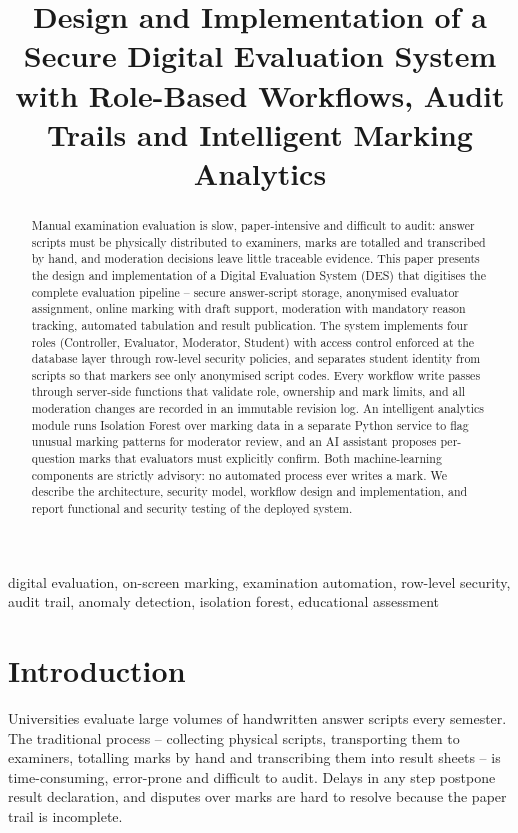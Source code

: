\documentclass[conference]{IEEEtran}
\begin{document}
\title{Design and Implementation of a Secure Digital Evaluation System with Role-Based Workflows, Audit Trails and Intelligent Marking Analytics}
\author{
}
\maketitle

\begin{abstract}
Manual examination evaluation is slow, paper-intensive and difficult to audit: answer scripts must be physically distributed to examiners, marks are totalled and transcribed by hand, and moderation decisions leave little traceable evidence. This paper presents the design and implementation of a Digital Evaluation System (DES) that digitises the complete evaluation pipeline -- secure answer-script storage, anonymised evaluator assignment, online marking with draft support, moderation with mandatory reason tracking, automated tabulation and result publication. The system implements four roles (Controller, Evaluator, Moderator, Student) with access control enforced at the database layer through row-level security policies, and separates student identity from scripts so that markers see only anonymised script codes. Every workflow write passes through server-side functions that validate role, ownership and mark limits, and all moderation changes are recorded in an immutable revision log. An intelligent analytics module runs Isolation Forest over marking data in a separate Python service to flag unusual marking patterns for moderator review, and an AI assistant proposes per-question marks that evaluators must explicitly confirm. Both machine-learning components are strictly advisory: no automated process ever writes a mark. We describe the architecture, security model, workflow design and implementation, and report functional and security testing of the deployed system.
\end{abstract}

\begin{IEEEkeywords}
digital evaluation, on-screen marking, examination automation, row-level security, audit trail, anomaly detection, isolation forest, educational assessment
\end{IEEEkeywords}

\section{Introduction}
Universities evaluate large volumes of handwritten answer scripts every semester. The traditional process -- collecting physical scripts, transporting them to examiners, totalling marks by hand and transcribing them into result sheets -- is time-consuming, error-prone and difficult to audit. Delays in any step postpone result declaration, and disputes over marks are hard to resolve because the paper trail is incomplete.
\end{document}
